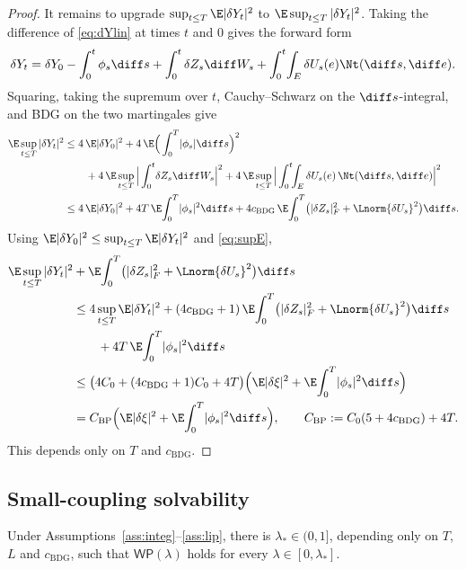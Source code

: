 \begin{proof}
It remains to upgrade $\sup_{t\le T}\E|\delta Y_t|^2$ to $\E\sup_{t\le T}|\delta Y_t|^2$. Taking the difference of
\eqref{eq:dYlin} at times $t$ and $0$ gives the forward form
\[
\delta Y_t=\delta Y_0-\int_0^t\phi_s\diff s+\int_0^t\delta Z_s\diff W_s+\int_0^t\!\int_E\delta U_s(e)\Nt(\diff s,\diff e) .
\]
Squaring, taking the supremum over $t$, Cauchy--Schwarz on the $\diff s$-integral, and BDG on
the two martingales give
\begin{align*}
\E\sup_{t\le T}|\delta Y_t|^2
&\le 4\,\E|\delta Y_0|^2+4\,\E\Big(\int_0^T\!|\phi_s|\diff s\Big)^{2}\\
&\qquad+4\,\E\sup_{t\le T}\Big|\int_0^t\!\delta Z_s\diff W_s\Big|^{2}
+4\,\E\sup_{t\le T}\Big|\int_0^t\!\!\int_E\delta U_s(e)\,\Nt(\diff s,\diff e)\Big|^{2}\\
&\le 4\,\E|\delta Y_0|^2+4T\,\E\!\int_0^T\!|\phi_s|^2\diff s
+4c_{\mathrm{BDG}}\,\E\!\int_0^T\!\big(|\delta Z_s|_F^2+\Lnorm{\delta U_s}^2\big)\diff s .
\end{align*}
Using $\E|\delta Y_0|^2\le\sup_{t\le T}\E|\delta Y_t|^2$ and \eqref{eq:supE},
\begin{align*}
\E\sup_{t\le T}|\delta Y_t|^2
&+\E\!\int_0^T\!\big(|\delta Z_s|_F^2+\Lnorm{\delta U_s}^2\big)\diff s\\
&\le 4\sup_{t\le T}\E|\delta Y_t|^2
+(4c_{\mathrm{BDG}}+1)\,\E\!\int_0^T\!\big(|\delta Z_s|_F^2+\Lnorm{\delta U_s}^2\big)\diff s\\
&\qquad+4T\,\E\!\int_0^T\!|\phi_s|^2\diff s\\
&\le\big(4C_0+(4c_{\mathrm{BDG}}+1)C_0+4T\big)
\Big(\E|\delta\xi|^2+\E\!\int_0^T\!|\phi_s|^2\diff s\Big)\\
&=C_{\mathrm{BP}}\Big(\E|\delta\xi|^2+\E\!\int_0^T\!|\phi_s|^2\diff s\Big),
\qquad C_{\mathrm{BP}}:=C_0(5+4c_{\mathrm{BDG}})+4T .
\end{align*}
This depends only on $T$ and $c_{\mathrm{BDG}}$.
\end{proof}

\subsection{Small-coupling solvability}

\begin{lemma}\label{lem:small}
Under Assumptions~\ref{ass:integ}--\ref{ass:lip}, there is $\lambda_*\in(0,1]$, depending only on $T$, $L$ and
$c_{\mathrm{BDG}}$, such that $\mathsf{WP}(\lambda)$ holds for
every $\lambda\in[0,\lambda_*]$.
\end{lemma}

